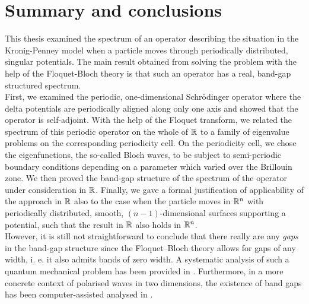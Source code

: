 \chapter{Summary and conclusions} \label{chap:8} %
	
This thesis examined the spectrum of an operator describing the situation in the Kronig-Penney model when a particle moves through periodically distributed, singular potentials. The main result obtained from solving the problem with the help of the Floquet-Bloch theory is that such an operator has a real, band-gap structured spectrum.
~\\

First, we examined the periodic, one-dimensional Schrödinger operator where the delta potentials are periodically aligned along only one axis and showed that the operator is self-adjoint. With the help of the Floquet transform, we related the spectrum of this periodic operator on the whole of $\mathbb{R}$ to a family of eigenvalue problems on the corresponding periodicity cell. On the periodicity cell, we chose the eigenfunctions, the so-called Bloch waves, to be subject to semi-periodic boundary conditions depending on a parameter which varied over the Brillouin zone. We then proved the band-gap structure of the spectrum of the operator under consideration in $\mathbb{R}$. Finally, we gave a formal justification of applicability of the approach in $\mathbb{R}$ also to the case when the particle moves in $\mathbb{R}^{n}$ with periodically distributed, smooth, $(n-1)$-dimensional surfaces supporting a potential, such that the result in $\mathbb{R}$ also holds in $\mathbb{R}^{n}$. 
~\\

However, it is still not straightforward to conclude that there really are any \textit{gaps} in the band-gap structure since the Floquet–Bloch theory allows for gaps of any width, i. e. it also admits bands of zero width. A systematic analysis of such a quantum mechanical problem has been provided in \cite{albeverio2012solvable}. Furthermore, in a more concrete context of polarised waves in two dimensions, the existence of band gaps has been computer-assisted analysed in \cite{hoang2009computer}. 
~\\


